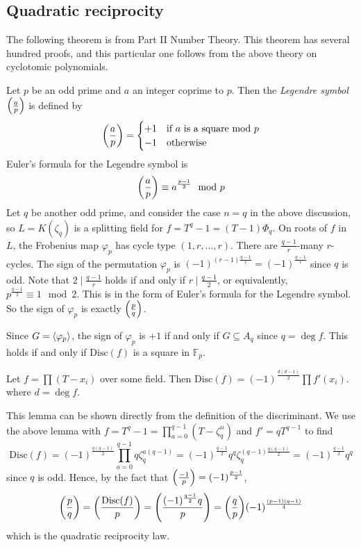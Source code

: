 \subsection{Quadratic reciprocity}
The following theorem is from Part II Number Theory.
This theorem has several hundred proofs, and this particular one follows from the above theory on cyclotomic polynomials.

Let \( p \) be an odd prime and \( a \) an integer coprime to \( p \).
Then the \emph{Legendre symbol} \( \qty(\frac a p) \) is defined by
\[ \qty(\frac a p) = \begin{cases}
	+1 & \text{if } a \text{ is a square mod } p \\
	-1 & \text{otherwise}
\end{cases} \]
Euler's formula for the Legendre symbol is
\[ \qty(\frac a p) \equiv a^{\frac{p-1}{2}} \mod p \]
Let \( q \) be another odd prime, and consider the case \( n = q \) in the above discussion, so \( L = K(\zeta_q) \) is a splitting field for \( f = T^q - 1 = (T - 1) \Phi_q \).
On roots of \( f \) in \( L \), the Frobenius map \( \varphi_p \) has cycle type \( (1, r, \dots, r) \).
There are \( \frac{q-1}{r} \)-many \( r \)-cycles.
The sign of the permutation \( \varphi_p \) is \( (-1)^{(r-1) \frac{q-1}{r}} = (-1)^{\frac{q-1}{r}} \) since \( q \) is odd.
Note that \( 2 \mid \frac{q-1}{r} \) holds if and only if \( r \mid \frac{q-1}{2} \), or equivalently, \( p^{\frac{q-1}{2}} \equiv 1 \mod 2 \).
This is in the form of Euler's formula for the Legendre symbol.
So the sign of \( \varphi_p \) is exactly \( \qty(\frac p q) \).

Since \( G = \left\langle{} \varphi_p \right\rangle \), the sign of \( \varphi_p \) is \( +1 \) if and only if \( G \subseteq A_q \) since \( q = \deg f \).
This holds if and only if \( \mathrm{Disc}(f) \) is a square in \( \mathbb F_p \).
\begin{lemma}
	Let \( f = \prod (T - x_i) \) over some field.
	Then \( \mathrm{Disc}(f) = (-1)^{\frac{d(d-1)}{2}} \prod f'(x_i) \).
	where \( d = \deg f \).
\end{lemma}
This lemma can be shown directly from the definition of the discriminant.
We use the above lemma with \( f = T^q - 1 = \prod_{a=0}^{q-1}(T - \zeta_q^n) \) and \( f' = qT^{q-1} \) to find
\[ \mathrm{Disc}(f) = (-1)^{\frac{q(q-1)}{2}} \prod_{a=0}^{q-1} q \zeta_q^{a(q-1)} = (-1)^{\frac{q-1}{2}} q^q \zeta_q^{(q-1)\frac{q(q-1)}{2}} = (-1)^{\frac{q-1}{2}} q^q \]
since \( q \) is odd.
Hence, by the fact that \( \qty(\frac{-1}{p}) = (-1)^{\frac{p-1}{2}} \),
\[ \qty(\frac p q) = \qty(\frac{\mathrm{Disc}(f)}{p}) = \qty(\frac{(-1)^{\frac{q-1}{2}}q}{p}) = \qty(\frac{q}{p}) (-1)^{\frac{(p-1)(q-1)}{4}} \]
which is the quadratic reciprocity law.

